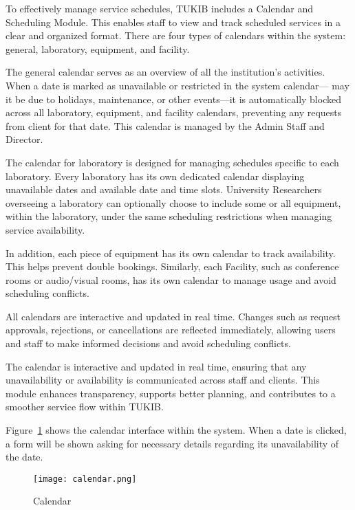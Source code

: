To effectively manage service schedules, TUKIB includes a Calendar and Scheduling Module. This enables staff to view and track scheduled services in a clear and organized format. There are four types of calendars within the system: general, laboratory, equipment, and facility.

The general calendar serves as an overview of all the institution's activities. When a date is marked as unavailable or restricted in the system calendar— may it be due to holidays, maintenance, or other events—it is automatically blocked across all laboratory, equipment, and facility calendars, preventing any requests from client for that date. This calendar is managed by the Admin Staff and Director.

The calendar for laboratory is designed for managing schedules specific to each laboratory. Every laboratory has its own dedicated calendar displaying unavailable dates and available date and time slots. University Researchers overseeing a laboratory can optionally choose to include some or all equipment, within the laboratory, under the same scheduling restrictions when managing service availability.

In addition, each piece of equipment has its own calendar to track availability. This helps prevent double bookings. Similarly, each Facility, such as conference rooms or audio/visual rooms, has its own calendar to manage usage and avoid scheduling conflicts.

All calendars are interactive and updated in real time. Changes such as request approvals, rejections, or cancellations are reflected immediately, allowing users and staff to make informed decisions and avoid scheduling conflicts.

The calendar is interactive and updated in real time, ensuring that any unavailability or availability is communicated across staff and clients. This module enhances transparency, supports better planning, and contributes to a smoother service flow within TUKIB.

Figure~\ref{fig:calendar} shows the calendar interface within the system. When a date is clicked, a form will be shown asking for necessary details regarding its unavailability of the date.

\begin{figure}[h]
    \centering
    \texttt{[image: calendar.png]}
    \caption{Calendar}
    \label{fig:calendar}
\end{figure}

\newpage

